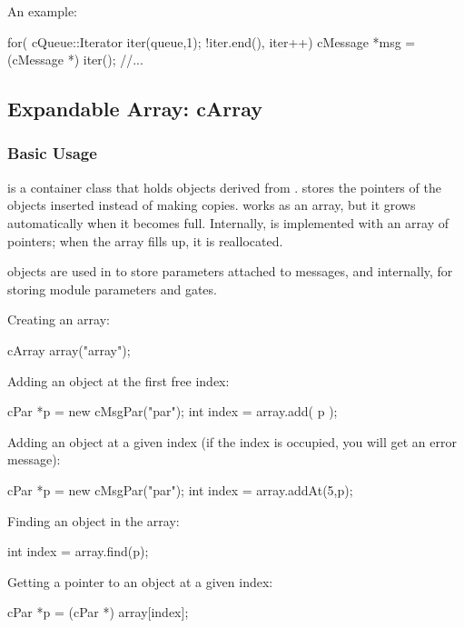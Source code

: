 An example:

\begin{cpp}
for( cQueue::Iterator iter(queue,1); !iter.end(), iter++)
{
  cMessage *msg = (cMessage *) iter();
  //...
}
\end{cpp}




\subsection{Expandable Array: cArray}

\subsubsection{Basic Usage}


 is a container class that holds objects derived from
.  stores the pointers of the objects
inserted instead of making copies.  works as an array,
but it grows automatically when it becomes full. Internally,
 is implemented with an array of pointers; when the array
fills up, it is reallocated.

 objects are used in {\opp} to store parameters
attached to messages, and internally, for storing module parameters
and gates.


Creating an array:

\begin{cpp}
cArray array("array");
\end{cpp}

Adding an object at the first free index:

\begin{cpp}
cPar *p = new cMsgPar("par");
int index = array.add( p );
\end{cpp}


Adding an object at a given index (if the index is occupied,
you will get an error message):

\begin{cpp}
cPar *p = new cMsgPar("par");
int index = array.addAt(5,p);
\end{cpp}


Finding an object in the array:

\begin{cpp}
int index = array.find(p);
\end{cpp}

Getting a pointer to an object at a given index:

\begin{cpp}
cPar *p = (cPar *) array[index];
\end{cpp}


